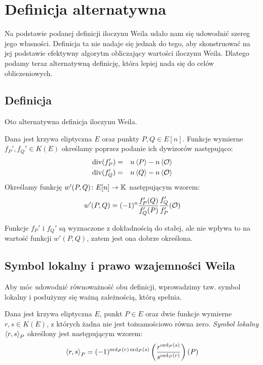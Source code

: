 \section{Definicja alternatywna}

Na podstawie podanej definicji iloczynu Weila
udało nam się udowodnić szereg jego własności.
Definicja ta nie nadaje się jednak do tego,
aby skonstruować na jej podstawie
efektywny algorytm obliczający wartości iloczynu Weila.
Dlatego podamy teraz alternatywną definicję,
która lepiej nada się do celów obliczeniowych.

\subsection*{Definicja}

Oto alternatywna definicja iloczynu Weila.

\begin{definition}
Dana jest krzywa eliptyczna $E$ oraz punkty $P, Q \in E[n]$.
Funkcje wymierne $f_P', f_Q' \in K(E)$
określamy poprzez podanie ich dywizorów
następująco:
\begin{eqnarray*}
\operatorname{div}(f_P') & = & n\left\langle P\right\rangle - n\left\langle\mathcal{O}\right\rangle \\
\operatorname{div}(f_Q') & = & n\left\langle Q\right\rangle - n\left\langle\mathcal{O}\right\rangle
\end{eqnarray*}
Określamy funkcję $w'(P, Q)\colon E[n] \to \mathbb{K}$
następującym wzorem:
\begin{equation}\label{weil_pairing_alt_eqn}
w'(P, Q) = (-1)^n\frac{f_P'(Q)}{f_Q'(P)}\frac{f_Q'}{f_P'}(\mathcal{O})
\end{equation}
\end{definition}

\begin{remark}
Funkcje $f_P'$ i $f_Q'$ są wyznaczone z dokładnością do stałej,
ale nie wpływa to na wartość funkcji $w'(P, Q)$,
zatem jest ona dobrze określona.
\end{remark}

\subsection*{Symbol lokalny i prawo wzajemności Weila}

Aby móc udowodnić równoważność obu definicji,
wprowadzimy tzw. symbol lokalny
i posłużymy się ważną zależnością, którą spełnia.

\begin{definition}
Dana jest krzywa eliptyczna $E$, punkt $P \in E$
oraz dwie funkcje wymierne $r, s \in K(E)$,
z których żadna nie jest tożsamościowo równa zero.
\emph{Symbol lokalny $\left\langle r , s \right\rangle_{P}$}
określony jest następującym wzorem:
\begin{equation}
\left\langle r , s \right\rangle_{P} =
(-1)^{\operatorname{ord}_P(r)\operatorname{ord}_P(s)}\left(\frac{r^{\operatorname{ord}_P(s)}}{s^{\operatorname{ord}_P(r)}}\right)(P)
\end{equation}
\end{definition}


